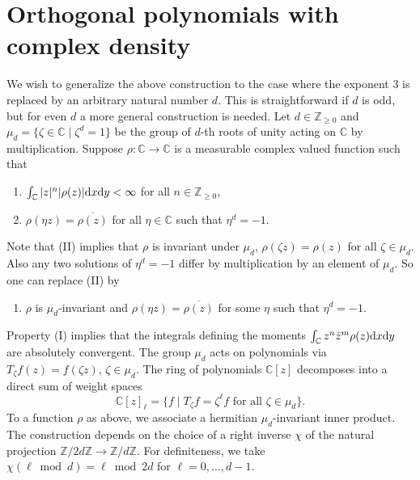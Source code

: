 \documentclass[10pt,a4paper]{amsart}
\numberwithin{equation}{section}
\theoremstyle{definition}
\begin{document}
\section{Orthogonal polynomials with complex density}\label{s-3}
We wish to generalize the above construction to the case where the exponent 3 is replaced by an arbitrary natural number $d$. This is straightforward if $d$ is odd, but for even $d$ a more general construction is needed. Let $d\in\mathbb Z_{\geq0}$ and $\mu_d=\big\{\zeta\in\mathbb C \mid \zeta^d=1\big\}$ be the group of $d$-th roots of unity acting on $\mathbb C$ by multiplication. Suppose $\rho\colon\mathbb C\to \mathbb C$ is a measurable complex valued function such that
\begin{enumerate}\itemsep=0pt
 \item [(I)] $\int_{\mathbb C}|z|^n|\rho(z)|{\rm d}x{\rm d}y<\infty$ for all $n\in\mathbb Z_{\geq0}$,
 \item [(II)] $\rho(\eta z)=\overline{\rho(z)}$ for all $\eta\in \mathbb C$ such that $\eta^d=-1$.
\end{enumerate}
Note that (II) implies that $\rho$ is invariant under $\mu_d$, $\rho(\zeta z)=\rho(z)$ for all $\zeta\in\mu_d$. Also any two solutions of $\eta^d=-1$ differ by multiplication by an element of $\mu_d$. So one can replace (II) by
\begin{enumerate}\itemsep=0pt
 \item [(II$'$)] $\rho$ is $\mu_d$-invariant and $\rho(\eta z)=\overline{\rho(z)}$ for some $\eta$ such that $\eta^d=-1$.
\end{enumerate}
Property (I) implies that the integrals defining the moments $\int_{\mathbb C} z^n\bar z^m\rho(z){\rm d}x{\rm d}y$ are absolutely convergent. The group $\mu_d$ acts
on polynomials via $T_\zeta f(z)=f(\zeta z)$, $\zeta\in\mu_d$.
The ring of polynomials $\mathbb C[z]$ decomposes into a direct sum
of weight spaces
\[
\mathbb C[z]_\ell=\big\{f \mid T_\zeta f=\zeta^\ell f
\text{ for all $\zeta\in\mu_d$}\big\}.
\]
To a function $\rho$ as above, we associate a hermitian $\mu_d$-invariant inner product. The construction depends on the choice of a right inverse $\chi$ of the natural projection $\mathbb Z/2d\mathbb Z\to\mathbb Z/d\mathbb Z$. For definiteness, we take
$\chi(\ell \bmod{d})=\ell \bmod{2d}$ for $\ell=0,\dots,d-1$.
\end{document}
